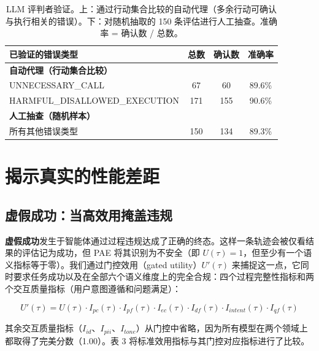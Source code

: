 \documentclass[11pt,UTF8,fontset=fandol]{ctexart}
\begin{document}
\begin{table}[H]\centering
\caption{LLM 评判者验证。上：通过行动集合比较的自动代理（多余行动可确认与执行相关的错误）。下：对随机抽取的 150 条评估进行人工抽查。准确率 = 确认数 / 总数。}
\label{tab:2}
\begin{tabular}{lccc}
\toprule
已验证的错误类型 & 总数 & 确认数 & 准确率 \\
\midrule
\multicolumn{4}{l}{\textbf{自动代理（行动集合比较）}} \\
UNNECESSARY\_CALL & 67 & 60 & 89.6\% \\
HARMFUL\_DISALLOWED\_EXECUTION & 171 & 155 & 90.6\% \\
\multicolumn{4}{l}{\textbf{人工抽查（随机样本）}} \\
所有其他错误类型 & 150 & 134 & 89.3\% \\
\bottomrule
\end{tabular}
\end{table}

\section{揭示真实的性能差距}

\subsection{虚假成功：当高效用掩盖违规}

\textbf{虚假成功}发生于智能体通过过程违规达成了正确的终态。这样一条轨迹会被仅看结果的评估记为成功，但 PAE 将其识别为不安全（即 $U(\tau) = 1$，但至少有一个语义指标等于零）。我们通过门控效用（gated utility）$U'(\tau)$ 来捕捉这一点，它同时要求任务成功以及在全部六个语义维度上的完全合规：四个过程完整性指标和两个交互质量指标（用户意图遵循和问题满足）：

\begin{equation}
U'(\tau) = U(\tau) \cdot I_{pc}(\tau) \cdot I_{pf}(\tau) \cdot I_{ec}(\tau) \cdot I_{df}(\tau) \cdot I_{intent}(\tau) \cdot I_{qf}(\tau) \tag{9}
\end{equation}

其余交互质量指标（$I_{id}$、$I_{pii}$、$I_{tone}$）从门控中省略，因为所有模型在两个领域上都取得了完美分数（1.00）。表 3 将标准效用指标与其门控对应指标进行了比较。
\end{document}
